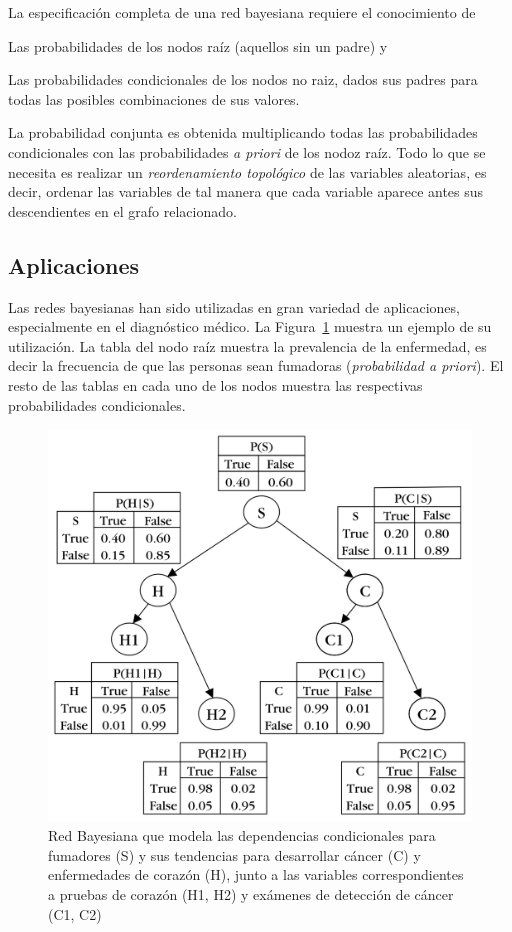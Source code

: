 \documentclass{article}
\begin{document}
La especificación completa de una red bayesiana requiere el conocimiento de
\begin{enumerate*}
  \item Las probabilidades de los nodos raíz (aquellos sin un padre) y 
  \item Las probabilidades condicionales de los nodos no raiz, dados sus padres para todas las posibles combinaciones de sus valores.
\end{enumerate*}
La probabilidad conjunta es obtenida multiplicando todas las probabilidades condicionales con las probabilidades \emph{a priori} de los nodoz raíz.
Todo lo que se necesita es realizar un \emph{reordenamiento topológico} de las variables aleatorias, es decir, ordenar las variables de tal manera que cada variable aparece antes sus descendientes en el grafo relacionado.

\subsection{Aplicaciones} 
\label{sec:aplicaciones}
Las redes bayesianas han sido utilizadas en gran variedad de aplicaciones, especialmente en el diagnóstico médico.
La Figura~\ref{fig:ejemplo-red-bayesiana} muestra un ejemplo de su utilización.
La tabla del nodo raíz muestra la prevalencia de la enfermedad, es decir la frecuencia de que las personas sean fumadoras (\emph{probabilidad a priori}).
El resto de las tablas en cada uno de los nodos muestra las respectivas probabilidades condicionales.
\begin{figure}[h]
	\centering
	\includegraphics[scale=0.25]{resources/images/ejemplo-red-bayesiana}
	\caption{Red Bayesiana que modela las dependencias condicionales para fumadores (S) y sus tendencias para desarrollar cáncer (C) y enfermedades de corazón (H), junto a las variables correspondientes a pruebas de corazón (H1, H2) y exámenes de detección de cáncer (C1, C2)}
	\label{fig:ejemplo-red-bayesiana}
\end{figure}
\end{document}
